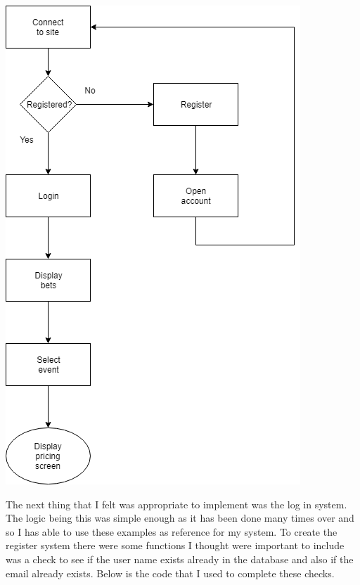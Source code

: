 \includegraphics[width=\textwidth,height=\textheight,keepaspectratio]{img/FlowchartSiteNav.png}

The next thing that I felt was appropriate to implement was the log in system. The logic being this was simple enough as it has been done many times over and so I has able to use these examples as reference for my system. To create the register system there were some functions I thought were important to include was a check to see if the user name exists already in the database and also if the email already exists. Below is the code that I used to complete these checks.


